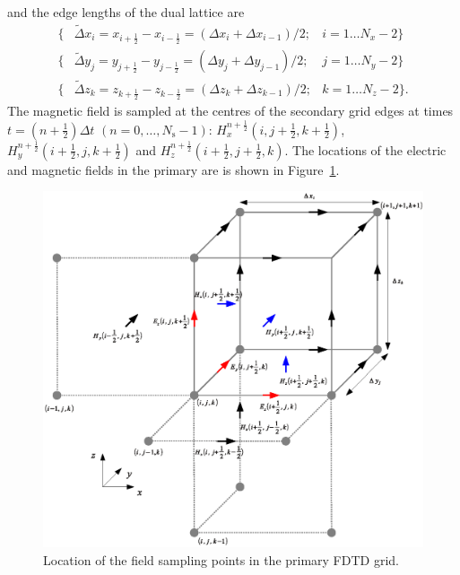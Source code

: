 \documentclass[onecolumn,a4paper]{article}
\newcommand{\half}{ {\scriptstyle \frac{1}{2}} }
\numberwithin{equation}{section}
\begin{document}
and the edge lengths of the dual lattice are
\begin{eqnarray}
\{ &\tilde{\Delta} x_i = x_{i+\half} - x_{i-\half}  = (\Delta x_i + \Delta x_{i-1})/2;& i = 1 \ldots N_x-2 \} \nonumber \\
\{ &\tilde{\Delta} y_j = y_{j+\half} - y_{j-\half}  = (\Delta y_j + \Delta y_{j-1})/2;& j = 1 \ldots N_y-2 \} \nonumber \\
\{ &\tilde{\Delta} z_k = z_{k+\half} - z_{k-\half}  = (\Delta z_k + \Delta z_{k-1})/2;& k = 1 \ldots N_z-2 \}.
\end{eqnarray}
The magnetic field is sampled at the centres of the secondary grid edges at times $t=(n+\half)\Delta t\,\,(n=0,\ldots,N_\mathrm{s}-1)$:
$H^{n+\half}_x(i,j+\half,k+\half)$, $H^{n+\half}_y(i+\half,j,k+\half)$ and $H^{n+\half}_z(i+\half,j+\half,k)$. The locations of the
electric and magnetic fields in the primary are is shown in Figure~\ref{fg:yeecell}.

\begin{figure}[t]
\centerline{\includegraphics[width=0.9\linewidth]{figures/yeecell}}
\caption{\label{fg:yeecell}Location of the field sampling points in the primary FDTD grid.}
\end{figure}
\end{document}
